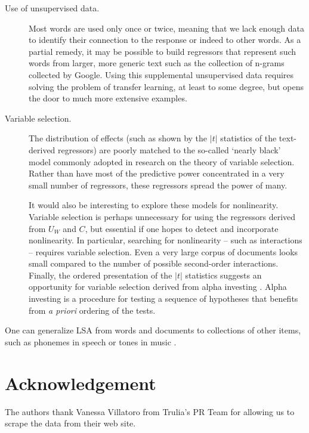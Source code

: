 \documentclass[12pt]{article}
\begin{document}
\begin{description}
   \item[Use of unsupervised data.] Most words are used only once or twice, meaning that we lack enough data to identify their connection to the response or indeed to other words.  As a partial remedy, it may be possible to build regressors that represent such words from larger, more generic text such as the collection of n-grams collected by Google.  Using this supplemental unsupervised data requires solving the problem of transfer learning, at least to some degree, but opens the door to much more extensive examples. 
   
   \item[Variable selection.]  The distribution of effects (such as shown by the $|t|$ statistics of the text-derived regressors) are poorly matched to the so-called `nearly black' model commonly adopted in research on the theory of variable selection.  Rather than have most of the predictive power concentrated in a very small number of regressors, these regressors spread the power of many.  
   
   It would also be interesting to explore these models for nonlinearity. Variable selection is perhaps unnecessary for using the regressors derived from $U_W$ and $C$, but essential if one hopes to detect and incorporate nonlinearity. In particular, searching for nonlinearity -- such as interactions -- requires variable selection.  Even a very large corpus of documents looks small compared to the number of possible second-order interactions.  Finally, the ordered presentation of the $|t|$ statistics suggests an opportunity for variable selection derived from alpha investing \citep{fosterstine08}.  Alpha investing is a procedure for testing a sequence of hypotheses that benefits from {\it a priori} ordering of the tests.
   
   \end{description}

One can generalize LSA from words and documents to collections of other items,
 such as phonemes in speech or tones in music \cite[called latent semantic
 mappingin][]{bellegarda05}.



\section*{Acknowledgement}

The authors thank Vanessa Villatoro from Trulia's PR Team for allowing us to scrape the data from their web site.





\end{document}
